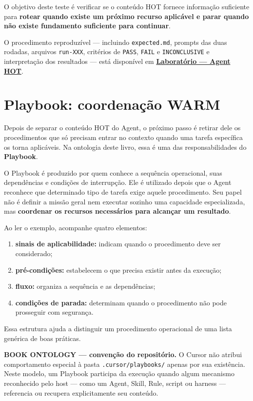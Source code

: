 \documentclass[
  10pt,
  a4paper,
  oneside]{book}
\providecommand{\tightlist}{%
  \setlength{\itemsep}{0pt}\setlength{\parskip}{0pt}}
\begin{document}
O objetivo deste teste é verificar se o conteúdo HOT fornece informação
suficiente para \textbf{rotear quando existe um próximo recurso
aplicável e parar quando não existe fundamento suficiente para
continuar}.

O procedimento reproduzível --- incluindo \texttt{expected.md}, prompts
das duas rodadas, arquivos \texttt{run-XXX}, critérios de \texttt{PASS},
\texttt{FAIL} e \texttt{INCONCLUSIVE} e interpretação dos resultados ---
está disponível em
\textbf{\protect\hyperlink{laboratorio-agent-hot}{Laboratório --- Agent
HOT}}.

\hypertarget{playbook-coordenauxe7uxe3o-warm}{%
\section{Playbook: coordenação
WARM}\label{playbook-coordenauxe7uxe3o-warm}}

Depois de separar o conteúdo HOT do Agent, o próximo passo é retirar
dele os procedimentos que só precisam entrar no contexto quando uma
tarefa específica os torna aplicáveis. Na ontologia deste livro, essa é
uma das responsabilidades do \textbf{Playbook}.

O Playbook é produzido por quem conhece a sequência operacional, suas
dependências e condições de interrupção. Ele é utilizado depois que o
Agent reconhece que determinado tipo de tarefa exige aquele
procedimento. Seu papel não é definir a missão geral nem executar
sozinho uma capacidade especializada, mas \textbf{coordenar os recursos
necessários para alcançar um resultado}.

Ao ler o exemplo, acompanhe quatro elementos:

\begin{enumerate}
\def\labelenumi{\arabic{enumi}.}
\tightlist
\item
  \textbf{sinais de aplicabilidade:} indicam quando o procedimento deve
  ser considerado;
\item
  \textbf{pré-condições:} estabelecem o que precisa existir antes da
  execução;
\item
  \textbf{fluxo:} organiza a sequência e as dependências;
\item
  \textbf{condições de parada:} determinam quando o procedimento não
  pode prosseguir com segurança.
\end{enumerate}

Essa estrutura ajuda a distinguir um procedimento operacional de uma
lista genérica de boas práticas.

\textbf{BOOK ONTOLOGY --- convenção do repositório.} O Cursor não
atribui comportamento especial à pasta \texttt{.cursor/playbooks/}
apenas por sua existência. Neste modelo, um Playbook participa da
execução quando algum mecanismo reconhecido pelo host --- como um Agent,
Skill, Rule, script ou harness --- referencia ou recupera explicitamente
seu conteúdo.
\end{document}
